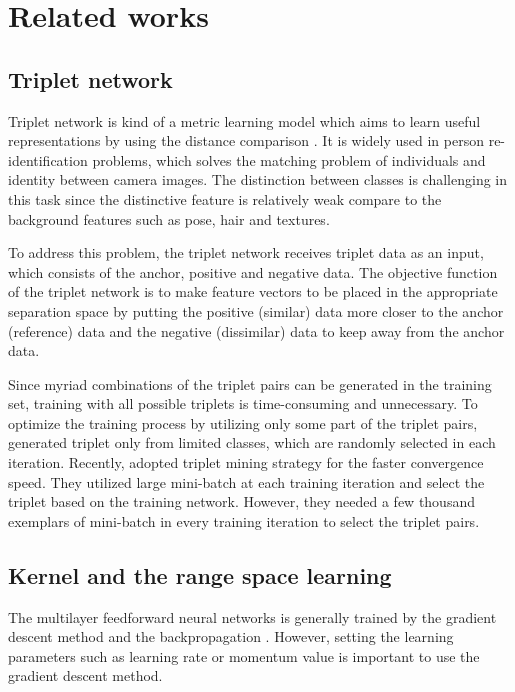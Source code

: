 \documentclass[runningheads]{llncs}
\begin{document}
\section{Related works}

\subsection{Triplet network}
Triplet network is kind of a metric learning model \cite{weinberger2006distance} which aims to learn useful representations by using the distance comparison \cite{hoffer2015deep}. It is widely used in person re-identification problems, which solves the matching problem of individuals and identity between camera images\cite{chen2017beyond,cheng2016person,ding2015deep,schroff2015facenet,wang2016joint}. 
The distinction between classes is challenging in this task since the distinctive feature is relatively weak compare to the background features such as pose, hair and textures.

To address this problem, the triplet network receives triplet data as an input, which consists of the anchor, positive and negative data. The objective function of the triplet network is to make feature vectors to be placed in the appropriate separation space by putting the positive (similar) data more closer to the anchor (reference) data and the negative (dissimilar) data to keep away from the anchor data.

Since myriad combinations of the triplet pairs can be generated in the training set, training with all possible triplets is time-consuming and unnecessary. To optimize the training process by utilizing only some part of the triplet pairs, \cite{cheng2016person,ding2015deep,wang2016joint} generated triplet only from limited classes, which are randomly selected in each iteration.
Recently, \cite{schroff2015facenet} adopted triplet mining strategy for the faster convergence speed. They utilized large mini-batch at each training iteration and select the triplet based on the training network.
However, they needed a few thousand exemplars of mini-batch in every training iteration to select the triplet pairs.

\subsection{Kernel and the range space learning}\label{kar}

The multilayer feedforward neural networks is generally trained by the gradient descent method and the backpropagation \cite{goodfellow2016deep}.
However, setting the learning parameters such as learning rate or momentum value is important to use the gradient descent method. 
\end{document}
